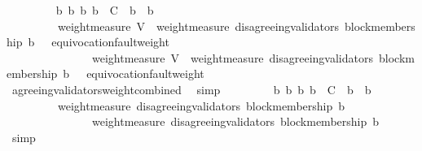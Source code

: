 \begin{isabellebody}
\ \ \isamarkupfalse%
\ {\isachardoublequoteopen}{\isasymforall}\ {\isasymsigma}\ {\isasymin}\ {\isasymSigma}{\isachardot}\ {\isasymforall}\ b\ b{\isacharprime}{\isachardot}\ {\isacharbraceleft}b{\isacharcomma}\ b{\isacharprime}{\isacharbraceright}\ {\isasymsubseteq}\ C\ {\isasymand}\ b{\isacharprime}\ {\isasymdownharpoonright}\ b\ \isanewline
\ \ \ \ \ \ \ \ {\isasymlongrightarrow}\ weight{\isacharunderscore}measure\ V\ {\isacharminus}\ weight{\isacharunderscore}measure\ {\isacharparenleft}disagreeing{\isacharunderscore}validators\ {\isacharparenleft}block{\isacharunderscore}membership\ b{\isacharprime}{\isacharcomma}\ {\isasymsigma}{\isacharparenright}{\isacharparenright}\ {\isacharminus}\ equivocation{\isacharunderscore}fault{\isacharunderscore}weight\ {\isasymsigma}\ \isanewline
\ \ \ \ \ \ \ \ \ \ \ \ \ \ {\isasymge}\ weight{\isacharunderscore}measure\ V\ {\isacharminus}\ weight{\isacharunderscore}measure\ {\isacharparenleft}disagreeing{\isacharunderscore}validators\ {\isacharparenleft}block{\isacharunderscore}membership\ b{\isacharcomma}\ {\isasymsigma}{\isacharparenright}{\isacharparenright}\ {\isacharminus}\ equivocation{\isacharunderscore}fault{\isacharunderscore}weight\ {\isasymsigma}{\isachardoublequoteclose}\isanewline
\ \ \ \ \isamarkupfalse%
\ agreeing{\isacharunderscore}validators{\isacharunderscore}weight{\isacharunderscore}combined\ \isamarkupfalse%
\ simp\isanewline
\ \ \isamarkupfalse%
\ {\isachardoublequoteopen}{\isasymforall}\ {\isasymsigma}\ {\isasymin}\ {\isasymSigma}{\isachardot}\ {\isasymforall}\ b\ b{\isacharprime}{\isachardot}\ {\isacharbraceleft}b{\isacharcomma}\ b{\isacharprime}{\isacharbraceright}\ {\isasymsubseteq}\ C\ {\isasymand}\ b{\isacharprime}\ {\isasymdownharpoonright}\ b\isanewline
\ \ \ \ \ \ \ \ {\isasymlongrightarrow}\ weight{\isacharunderscore}measure\ {\isacharparenleft}disagreeing{\isacharunderscore}validators\ {\isacharparenleft}block{\isacharunderscore}membership\ b{\isacharcomma}\ {\isasymsigma}{\isacharparenright}{\isacharparenright}\ \isanewline
\ \ \ \ \ \ \ \ \ \ \ \ \ \ {\isasymge}\ weight{\isacharunderscore}measure\ {\isacharparenleft}disagreeing{\isacharunderscore}validators\ {\isacharparenleft}block{\isacharunderscore}membership\ b{\isacharprime}{\isacharcomma}\ {\isasymsigma}{\isacharparenright}{\isacharparenright}{\isachardoublequoteclose}\isanewline
\ \ \ \ \isamarkupfalse%
\ simp\isanewline
\ \ \isamarkupfalse%

\end{isabellebody}
